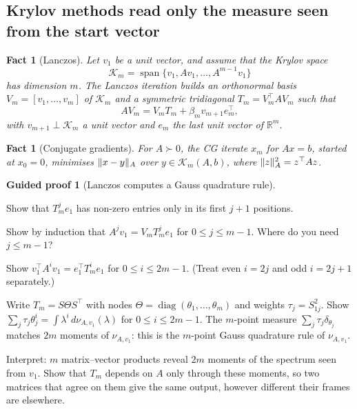 \documentclass[11pt,a4paper]{article}
\newcommand{\R}{\mathbb{R}}
\DeclareMathOperator{\diag}{diag}
\DeclareMathOperator{\spn}{span}
\DeclarePairedDelimiter{\norm}{\lVert}{\rVert}
\theoremstyle{plain}
\newtheorem{fact}[proposition]{Fact}
\theoremstyle{definition}
\newtheorem{guided}[proposition]{Guided proof}
\theoremstyle{remark}
\begin{document}
\subsection{Krylov methods read only the measure seen from the start vector}\label{sec:krylov}

\begin{fact}[Lanczos]\label{fact:lanczos}
Let $v_1$ be a unit vector, and assume that the Krylov space
\[\mathcal{K}_m=\spn\{v_1,Av_1,\dots,A^{m-1}v_1\}\]
has dimension $m$. The Lanczos iteration builds an orthonormal basis $V_m=[v_1,\dots,v_m]$ of $\mathcal{K}_m$ and a
symmetric tridiagonal $T_m=V_m^\top AV_m$ such that
\[AV_m=V_mT_m+\beta_mv_{m+1}e_m^\top,\]
with $v_{m+1}\perp\mathcal{K}_m$ a unit vector and $e_m$ the last unit vector of $\R^m$.
\end{fact}

\begin{fact}[Conjugate gradients]\label{fact:cg}
For $A\succ0$, the CG iterate $x_m$ for $Ax=b$, started at $x_0=0$, minimises $\norm{x-y}_A$ over $y\in\mathcal{K}_m(A,b)$,
where $\norm{z}_A^2=z^\top Az$.
\end{fact}

\begin{guided}[Lanczos computes a Gauss quadrature rule]\label{gp:lanczos}
\begin{steps}
\item Show that $T_m^je_1$ has non-zero entries only in its first $j+1$ positions.
\item Show by induction that $A^jv_1=V_mT_m^je_1$ for $0\le j\le m-1$. Where do you need $j\le m-1$?
\item Show $v_1^\top A^iv_1=e_1^\top T_m^ie_1$ for $0\le i\le2m-1$. (Treat even $i=2j$ and odd $i=2j+1$ separately.)
\item Write $T_m=S\Theta S^\top$ with nodes $\Theta=\diag(\theta_1,\dots,\theta_m)$ and weights $\tau_j=S_{1j}^2$.
  Show $\sum_j\tau_j\theta_j^i=\int\lambda^i\,d\nu_{A,v_1}(\lambda)$ for $0\le i\le2m-1$. The $m$-point measure
  $\sum_j\tau_j\delta_{\theta_j}$ matches $2m$ moments of $\nu_{A,v_1}$: this is the $m$-point Gauss quadrature rule
  of $\nu_{A,v_1}$.
\item Interpret: $m$ matrix--vector products reveal $2m$ moments of the spectrum seen from $v_1$. Show that $T_m$
  depends on $A$ only through these moments, so two matrices that agree on them give the same output, however
  different their frames are elsewhere.
\end{steps}
\end{guided}
\end{document}
